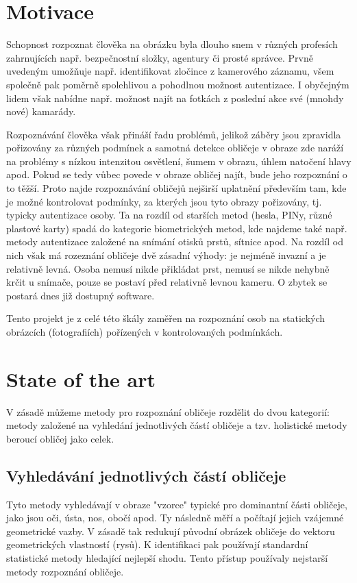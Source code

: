 \documentclass[10pt,a4paper]{article}
\begin{document}
\section{Motivace}

Schopnost rozpoznat člověka na obrázku byla dlouho snem v různých profesích zahrnujících
např. bezpečnostní složky, agentury či prosté správce. Prvně uvedeným umožňuje např. identifikovat
zločince z kamerového záznamu, všem společně pak poměrně spolehlivou a pohodlnou možnost
autentizace. I obyčejným lidem však nabídne např. možnost najít na fotkách z poslední akce
své (mnohdy nové) kamarády.

Rozpoznávání člověka však přináší řadu problémů, jelikož záběry jsou zpravidla pořizovány za různých podmínek
a samotná detekce obličeje v obraze zde naráží na problémy s nízkou intenzitou osvětlení, šumem v obrazu, úhlem natočení
hlavy apod. Pokud se tedy vůbec povede v obraze obličej najít, bude jeho rozpoznání o to těžší. Proto najde rozpoznávání
obličejů nejširší uplatnění především tam, kde je možné kontrolovat podmínky, za kterých jsou tyto obrazy pořizovány, tj.
typicky autentizace osoby. Ta na rozdíl od starších metod (hesla, PINy, různé plastové karty) spadá do kategorie 
biometrických metod, kde najdeme také např. metody autentizace založené na snímání otisků prstů, sítnice apod. Na rozdíl
od nich však má rozeznání obličeje dvě zásadní výhody: je nejméně invazní a je relativně levná. Osoba nemusí nikde
přikládat prst, nemusí se nikde nehybně krčit u snímače, pouze se postaví před relativně levnou kameru. O zbytek se
postará dnes již dostupný software.

Tento projekt je z celé této škály zaměřen na rozpoznání osob na statických obrázcích (fotografiích) pořízených v
kontrolovaných podmínkách.

\section{State of the art}

V zásadě můžeme metody pro rozpoznání obličeje rozdělit do dvou kategorií: metody založené na vyhledání 
jednotlivých částí obličeje a tzv. holistické metody beroucí obličej jako celek.

\subsection{Vyhledávání jednotlivých částí obličeje}

Tyto metody vyhledávají v obraze "vzorce" typické pro dominantní části obličeje, jako jsou oči, ústa, nos, obočí apod. Ty
následně měří a počítají jejich vzájemné geometrické vazby. V zásadě tak redukují původní obrázek obličeje do vektoru 
geometrických vlastností (rysů). K identifikaci pak používají standardní statistické metody hledající nejlepší shodu.
Tento přístup používaly nejstarší metody rozpoznání obličeje.
\end{document}
